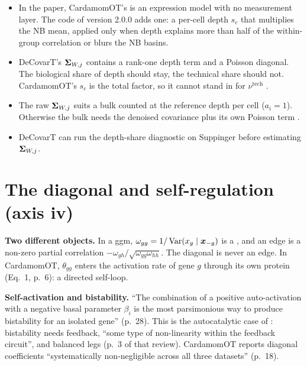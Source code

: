 \documentclass[11pt,a4paper]{article}
\begin{document}
\begin{answerbox}[title=In short: noise layers]
\begin{itemize}
  \item In the paper, CardamomOT's  is an expression model with no measurement layer.
        The code of version 2.0.0 adds one: a per-cell depth $s_c$ that multiplies the NB mean, applied
        only when depth explains more than half of the within-group correlation or blurs the NB basins.
  \item DeCovarT's $\bm{\Sigma}_{W,j}$ contains a rank-one depth term and a Poisson diagonal. The biological share of
        depth should stay, the technical share should not. CardamomOT's $s_c$ is the total factor, so it cannot
        stand in for $\nu^{\mathrm{tech}}$ .
  \item The raw $\bm{\Sigma}_{W,j}$ suits a bulk counted at the reference depth per cell ($a_i=1$). Otherwise the bulk needs the
        denoised covariance plus its own Poisson term .
  \item DeCovarT can run the depth-share diagnostic on Suppinger before estimating $\bm{\Sigma}_{W,j}$.
\end{itemize}
\end{answerbox}

\section{The diagonal and self-regulation (axis iv)}\label{sec:diag}

\textbf{Two different objects.} In a \gls{ggm}, $\omega_{gg}=1/\operatorname{Var}(x_g\mid\bm x_{-g})$ is a
, and an edge is a non-zero partial correlation
$-\omega_{gh}/\sqrt{\omega_{gg}\omega_{hh}}$. The diagonal is never an edge. In CardamomOT, $\theta_{gg}$
enters the activation rate of gene $g$ through its own protein (Eq.~1, p.~6): a directed self-loop.

\textbf{Self-activation and bistability.} \enquote{The combination of a positive auto-activation with a
negative basal parameter $\beta_i$ is the most parsimonious way to produce bistability for an isolated
gene} (p.~28). This is the autocatalytic case of \parencite{ferrellSelfperpetuatingStatesSignal2002}: bistability needs feedback, \enquote{some type of non-linearity
within the feedback circuit}, and balanced legs (p.~3 of that review). CardamomOT reports diagonal
coefficients \enquote{systematically non-negligible across all three datasets} (p.~18).
\end{document}
